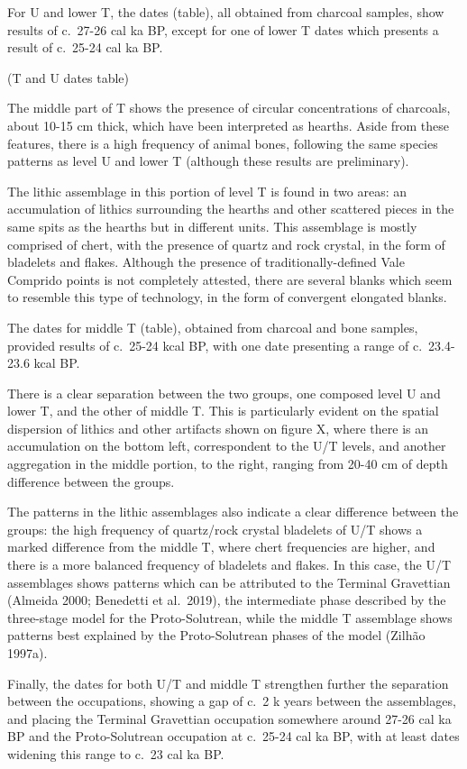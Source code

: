 \documentclass[12pt,twoside]{reedthesis}
\begin{document}
For U and lower T, the dates (table), all obtained from charcoal samples, show results of c.~27-26 cal ka BP, except for one of lower T dates which presents a result of c.~25-24 cal ka BP.

(T and U dates table)

The middle part of T shows the presence of circular concentrations of charcoals, about 10-15 cm thick, which have been interpreted as hearths. Aside from these features, there is a high frequency of animal bones, following the same species patterns as level U and lower T (although these results are preliminary).

The lithic assemblage in this portion of level T is found in two areas: an accumulation of lithics surrounding the hearths and other scattered pieces in the same spits as the hearths but in different units. This assemblage is mostly comprised of chert, with the presence of quartz and rock crystal, in the form of bladelets and flakes. Although the presence of traditionally-defined Vale Comprido points is not completely attested, there are several blanks which seem to resemble this type of technology, in the form of convergent elongated blanks.

The dates for middle T (table), obtained from charcoal and bone samples, provided results of c.~25-24 kcal BP, with one date presenting a range of c.~23.4-23.6 kcal BP.

There is a clear separation between the two groups, one composed level U and lower T, and the other of middle T. This is particularly evident on the spatial dispersion of lithics and other artifacts shown on figure X, where there is an accumulation on the bottom left, correspondent to the U/T levels, and another aggregation in the middle portion, to the right, ranging from 20-40 cm of depth difference between the groups.

The patterns in the lithic assemblages also indicate a clear difference between the groups: the high frequency of quartz/rock crystal bladelets of U/T shows a marked difference from the middle T, where chert frequencies are higher, and there is a more balanced frequency of bladelets and flakes. In this case, the U/T assemblages shows patterns which can be attributed to the Terminal Gravettian (Almeida 2000; Benedetti et al.~2019), the intermediate phase described by the three-stage model for the Proto-Solutrean, while the middle T assemblage shows patterns best explained by the Proto-Solutrean phases of the model (Zilhão 1997a).

Finally, the dates for both U/T and middle T strengthen further the separation between the occupations, showing a gap of c.~2 k years between the assemblages, and placing the Terminal Gravettian occupation somewhere around 27-26 cal ka BP and the Proto-Solutrean occupation at c.~25-24 cal ka BP, with at least dates widening this range to c.~23 cal ka BP.
\end{document}
